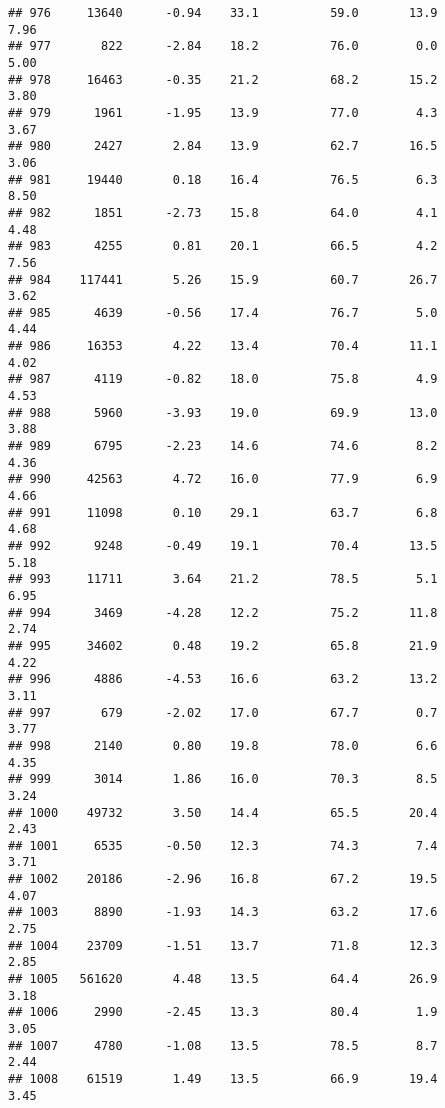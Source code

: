 \documentclass[
]{article}
\begin{document}
\begin{verbatim}
## 976     13640      -0.94    33.1          59.0       13.9              7.96
## 977       822      -2.84    18.2          76.0        0.0              5.00
## 978     16463      -0.35    21.2          68.2       15.2              3.80
## 979      1961      -1.95    13.9          77.0        4.3              3.67
## 980      2427       2.84    13.9          62.7       16.5              3.06
## 981     19440       0.18    16.4          76.5        6.3              8.50
## 982      1851      -2.73    15.8          64.0        4.1              4.48
## 983      4255       0.81    20.1          66.5        4.2              7.56
## 984    117441       5.26    15.9          60.7       26.7              3.62
## 985      4639      -0.56    17.4          76.7        5.0              4.44
## 986     16353       4.22    13.4          70.4       11.1              4.02
## 987      4119      -0.82    18.0          75.8        4.9              4.53
## 988      5960      -3.93    19.0          69.9       13.0              3.88
## 989      6795      -2.23    14.6          74.6        8.2              4.36
## 990     42563       4.72    16.0          77.9        6.9              4.66
## 991     11098       0.10    29.1          63.7        6.8              4.68
## 992      9248      -0.49    19.1          70.4       13.5              5.18
## 993     11711       3.64    21.2          78.5        5.1              6.95
## 994      3469      -4.28    12.2          75.2       11.8              2.74
## 995     34602       0.48    19.2          65.8       21.9              4.22
## 996      4886      -4.53    16.6          63.2       13.2              3.11
## 997       679      -2.02    17.0          67.7        0.7              3.77
## 998      2140       0.80    19.8          78.0        6.6              4.35
## 999      3014       1.86    16.0          70.3        8.5              3.24
## 1000    49732       3.50    14.4          65.5       20.4              2.43
## 1001     6535      -0.50    12.3          74.3        7.4              3.71
## 1002    20186      -2.96    16.8          67.2       19.5              4.07
## 1003     8890      -1.93    14.3          63.2       17.6              2.75
## 1004    23709      -1.51    13.7          71.8       12.3              2.85
## 1005   561620       4.48    13.5          64.4       26.9              3.18
## 1006     2990      -2.45    13.3          80.4        1.9              3.05
## 1007     4780      -1.08    13.5          78.5        8.7              2.44
## 1008    61519       1.49    13.5          66.9       19.4              3.45

\end{verbatim}
\end{document}
